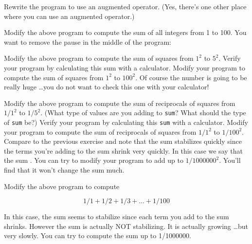 \begin{ex}
 Rewrite the program to use an augmented operator.
(Yes, there's one other place where you can use an
augmented operator.)
\end{ex}

\begin{ex}
 Modify the above program to compute the sum of all
integers from 1 to 100. You want to remove the pause in the middle of
the program:
    
\end{ex}

\begin{ex}
Modify the above program to compute the sum of squares from $1^{2}$ to $5^{2}$. Verify your program by calculating this sum with a calculator. Modify your program to compute the sum of squares from $1^{2}$ to $100^{2}$. Of course the number is going to be really huge \ldots you do not want to check this one with your calculator!
\end{ex}

\begin{ex}
Modify the above program to compute the sum of reciprocals of squares from $1/1^{2}$ to $1/5^{2}$. (What type of values are you adding to \texttt{sum}? What should the type of \texttt{sum} be?) Verify your program by calculating this \texttt{sum} with a calculator. Modify your program to compute the sum of reciprocals of squares from $1/1^{2}$ to $1/100^{2}$. Compare to the previous exercise and note that the sum stabilizes quickly since the terms you're adding to the sum shrink very quickly. In this case we say that the sum . You can try to modify your program to add up to $1/1000000^{2}$. You'll find that it won't change the sum much.
\end{ex}

\begin{ex}
Modify the above program to compute

\[1/1 + 1/2 + 1/3 + \ldots + 1/100\]

In this case, the sum seems to stabilize since each term you add to the
sum shrinks. However the sum is actually NOT stabilizing. It is actually
growing \ldots but very slowly. You can try to compute the sum up to
1/1000000.
\end{ex}

